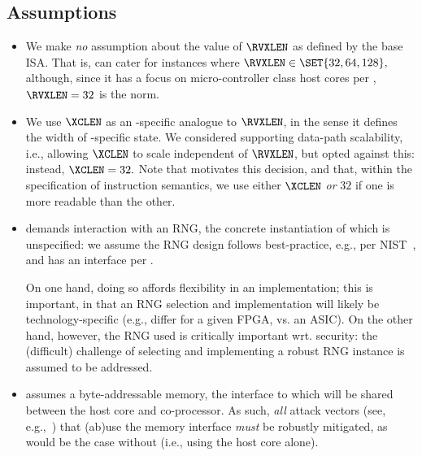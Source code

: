 
\subsection{Assumptions}
\label{sec:bg:assumption}

\begin{itemize}

\item We make {\em no} assumption about the value of $\RVXLEN$ as defined
      by the base ISA.  That is, \XCID can cater for instances where
      $
      \RVXLEN \in \SET{ 32, 64, 128 } ,
      $
      although, since it has a focus on micro-controller class host cores
      per ,
      $
      \RVXLEN = 32
      $
      is the norm.

\item We use $\XCLEN$ as an \XCID-specific analogue to $\RVXLEN$, in the
      sense it defines the width of \XCID-specific state.  We considered
      supporting data-path scalability, i.e., allowing $\XCLEN$ to scale
      independent of $\RVXLEN$, but opted against this: instead, 
      $
      \XCLEN = 32 .
      $
      Note that  motivates this decision, and that,
      within the specification of instruction semantics, we use either
      $\XCLEN$ {\em or} $32$ if one is more readable than the other.

\item \XCID demands interaction with an RNG, the concrete instantiation of 
      which is unspecified: we assume the RNG design follows best-practice,
      e.g., per NIST~\cite{SCARV:NIST:SP:800_90a,SCARV:NIST:SP:800_90b,SCARV:NIST:SP:800_90c},
      and has an interface per \cite[Section 6.4]{SCARV:NIST:SP:800_90c}.

      On one hand, doing so affords flexibility in an implementation; this 
      is important, in that an RNG selection and implementation will likely 
      be technology-specific (e.g., differ for a given FPGA, vs. an ASIC).  
      On the other hand, however, the RNG used is critically important wrt. 
      security: the (difficult) challenge of selecting and implementing 
      a robust RNG instance is assumed to be addressed.

\item \XCID assumes a byte-addressable memory, the interface to which will
      be shared between the host core and co-processor.  As such, {\em all}
      attack vectors
      (see, e.g.,~\cite{SCARV:GYCH:18})
      that (ab)use the memory interface {\em must} be robustly mitigated, 
      as would be the case without \XCID (i.e., using the host core alone).

\end{itemize}

